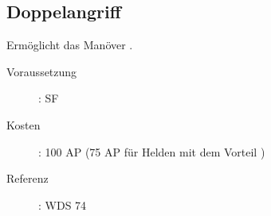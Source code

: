 \subsection{Doppelangriff}
\label{sf.doppelangriff}
Ermöglicht das Manöver .
\begin{description}
    \item[Voraussetzung]:
        SF 
    \item [Kosten]:
        100 AP (75 AP für Helden mit dem Vorteil )
    \item [Referenz]:
        WDS 74
\end{description}
